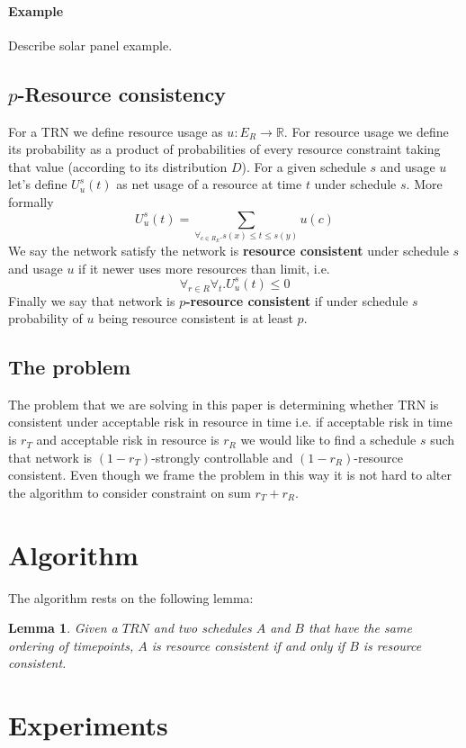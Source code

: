 \documentclass{article}
\newtheorem{lemma}[theorem]{Lemma}
\begin{document}
\begin{multicols}{2}
\paragraph{Example} Describe solar panel example.


\subsection{$p$-Resource consistency}
For a TRN we define resource usage as $u:E_R \rightarrow \mathbb{R}$. For resource usage we define its probability as a product of probabilities of every resource constraint taking that value (according to its distribution $D$).
For a given schedule $s$ and usage $u$ let's define $U_u^s(t)$ as net usage of a resource at time $t$ under schedule $s$. More formally
\[
U_u^s(t) = \sum_{\forall_{c \in R_E}. s(x)\leq t \leq s(y)} u(c)
\]
We say the network satisfy the network is \textbf{resource consistent} under schedule $s$ and usage $u$ if it newer uses more resources than limit, i.e.
\[
\forall_{r \in R} \forall_{t} . U_u^s(t) \leq 0
\]
Finally we say that network is \textbf{$p$-resource consistent} if under schedule $s$ probability of $u$ being resource consistent is at least $p$.
\subsection{The problem}
The problem that we are solving in this paper is determining whether TRN is consistent under acceptable risk in resource in time i.e. if acceptable risk in time is $r_T$ and acceptable risk in resource is $r_R$ we would like to find a schedule $s$ such that network is $(1-r_T)$-strongly controllable and $(1-r_R)$-resource consistent. Even though we frame the problem in this way it is not hard to alter the algorithm to consider constraint on sum $r_T + r_R$.
\section{Algorithm}
The algorithm rests on the following lemma:
\begin{lemma}
Given a $TRN$ and two schedules $A$ and $B$ that have the same ordering of timepoints, $A$ is resource consistent if and only if $B$ is resource consistent.
\end{lemma}

\section{Experiments}
\blindtext[5]

\end{multicols}
\end{document}
